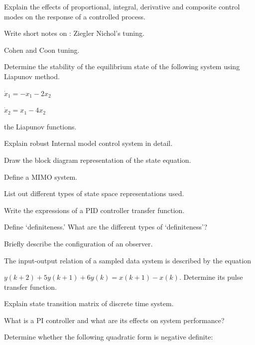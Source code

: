 \item \iitem Explain the effects of proportional, integral, derivative and composite
  control modes on the response of a controlled process.
\Or
\item Write short notes on :
\iitem Ziegler Nichol's tuning.
\item Cohen and Coon tuning.
\ene \ene

\item \iitem Determine the stability of the equilibrium state of the following system using Liapunov
  method.

\hspace{2cm} $\dot{x}_1 = - x_1 - 2x_2$

\hspace{2cm} $\dot{x}_2 = x_1 - 4x_2$

\hspace{1cm} the Liapunov functions.
\Or
\item Explain robust Internal model control system in detail.
\ene

\markC
\ene

\newpage

\sub{\subj}
\maxtime

\partA

\iitem Draw the block diagram representation of the state equation.
\item Define a MIMO system.
\item List out different types of state space representations used.
\item Write the expressions of a PID controller transfer function.
\item Define `definiteness.' What are the different types of `definiteness'?

\markA
\partB

\item Briefly describe the configuration of an observer.
\item The input-output relation of a sampled data system is described by the equation

\hspace{1cm} $y(k+2) + 5y(k+1) + 6y(k) = x(k+1) - x(k).$ Determine its pulse transfer function.
\item Explain state transition matrix of discrete time system.
\item What is a PI controller and what are its effects on system performance?
\item Determine whether the following quadratic form is negative definite:


